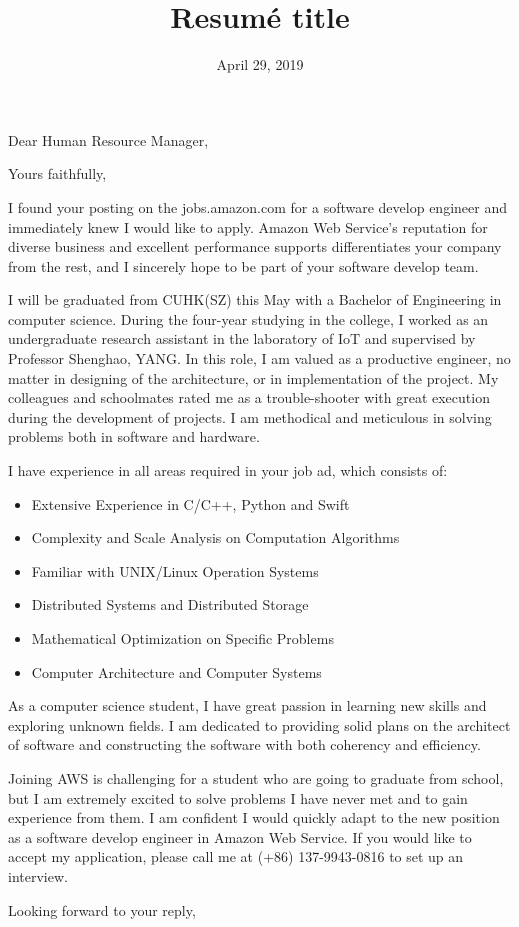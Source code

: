 \documentclass[10pt,a4paper,sans]{moderncv}        %
\title{Resumé title}                               %
\begin{document}
\date{April 29, 2019}
\opening{Dear Human Resource Manager,}
\closing{Yours faithfully,}
\makelettertitle

I found your posting on the jobs.amazon.com for a software develop engineer and immediately knew I would like to apply. Amazon Web Service's reputation for diverse business and excellent performance supports differentiates your company from the rest, and I sincerely hope to be part of your software develop team.

I will be graduated from CUHK(SZ) this May with a Bachelor of Engineering in computer science. During the four-year studying in the college, I worked as an undergraduate research assistant in the laboratory of IoT and supervised by Professor Shenghao, YANG. In this role, I am valued as a productive engineer, no matter in designing of the architecture, or in implementation of the project. My colleagues and schoolmates rated me as a trouble-shooter with great execution during the development of projects. I am methodical and meticulous in solving problems both in software and hardware.

I have experience in all areas required in your job ad, which consists of:
\\
\begin{itemize}
	\item Extensive Experience in C/C++, Python and Swift 
	\item Complexity and Scale Analysis on Computation Algorithms
	\item Familiar with UNIX/Linux Operation Systems
	\item Distributed Systems and Distributed Storage
	\item Mathematical Optimization on Specific Problems
	\item Computer Architecture and Computer Systems
\end{itemize}

As a computer science student, I have great passion in learning new skills and exploring unknown fields. I am dedicated to providing solid plans on the architect of software and constructing the software with both coherency and efficiency. 

Joining AWS is challenging for a student who are going to graduate from school, but I am extremely excited to solve problems I have never met and to gain experience from them. I am confident I would quickly adapt to the new position as a software develop engineer in Amazon Web Service. If you would like to accept my application, please call me at (+86) 137-9943-0816 to set up an interview.

Looking forward to your reply, 

\makeletterclosing
\end{document}
